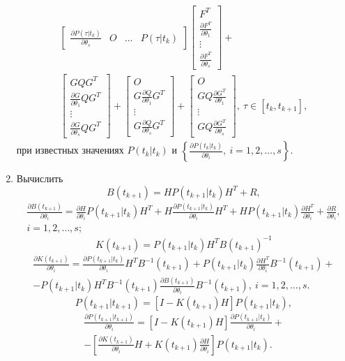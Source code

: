 \documentclass[a4paper,14pt]{extarticle}
\newcommand{\pd}[2]{\frac{\partial #1}{\partial #2}}
\newcommand{\inv}[1]{#1^{-1}}
\begin{document}
\begin{enumerate}
\begin{gather*}
\begin{bmatrix}
		\pd{P(\tau|t_k)}{\theta_s} & O & \ldots & P(\tau|t_k)
	\end{bmatrix}
	\begin{bmatrix}
		F^T \\
		\pd{F^T}{\theta_1} \\
		\vdots \\
		\pd{F^T}{\theta_s}
	\end{bmatrix} + \\
	\begin{bmatrix}
		G Q G^T \\
		\pd{G}{\theta_1} Q G^T \\
		\vdots \\
		\pd{G}{\theta_s} Q G^T 
	\end{bmatrix} +
	\begin{bmatrix}
		O \\
		G \pd{Q}{\theta_1} G^T \\
		\vdots \\
		G \pd{Q}{\theta_s} G^T
	\end{bmatrix} +
	\begin{bmatrix}
		O \\
		G Q \pd{G^T}{\theta_1} \\
		\vdots \\
		G Q \pd{G^T}{\theta_s}
	\end{bmatrix},\ \tau \in [t_k, t_{k+1}],
\end{gather*}
при известных значениях $P(t_k|t_k)$ и
	$\left\{ \pd{P(t_k| t_k)}{\theta_i},\ i = 1,2,\ldots,s \right\}$.

\item Вычислить
	\[
		B(t_{k+1}) = H P(t_{k+1}|t_k) H^T + R,
	\]
	\begin{align*}
		\pd{B(t_{k+1})}{\theta_i} = \pd{H}{\theta_i} P(t_{k+1}|t_k) H^T + 
			H \pd{P(t_{k+1}|t_k)}{\theta_i} H^T + H P(t_{k+1}|t_k)
			\pd{H^T}{\theta_i} + \pd{R}{\theta_i}, \\
		i = 1,2,\ldots,s;
	\end{align*}
	\[
		K(t_{k+1}) = P(t_{k+1}|t_k) H^T \inv{B(t_{k+1})}
	\]
	\begin{multline*}
		\pd{K(t_{k+1})}{\theta_i} = \pd{P(t_{k+1}|t_{k})}{\theta_i} H^T 
			\inv{B}(t_{k+1}) +
			P(t_{k+1}|t_{k}) \pd{H^T}{\theta_i} \inv{B}(t_{k+1}) + \\ 
			- P(t_{k+1}|t_{k}) H^T
			\inv{B}(t_{k+1}) \pd{B(t_{k+1})}{\theta_i} \inv{B}(t_{k+1}),\ i = 1, 2, \ldots, s.
	\end{multline*}
	\[
		P(t_{k+1}|t_{k+1}) = [ I - K(t_{k+1}) H ] P(t_{k+1}|t_k),
	\]
	\begin{multline*}
		\pd{P(t_{k+1}|t_{k+1})}{\theta_i} =
			[ I - K(t_{k+1}) H ] \pd{P(t_{k+1}|t_k)}{\theta_i} + \\ -
			\left[
				\pd{K(t_{k+1})}{\theta_i} H + K(t_{k+1}) \pd{H}{\theta_i}
			\right]
			P(t_{k+1}|t_k).
	\end{multline*}


\end{enumerate}
\end{document}
